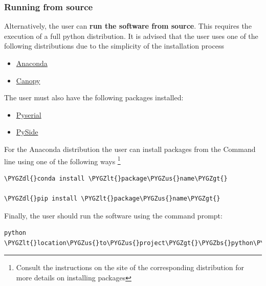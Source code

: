 \documentclass[letterpaper,10pt,english]{sphinxmanual}
\def\PYGZbs{\char`\\}
\def\PYGZus{\char`\_}
\def\PYGZlt{\char`\<}
\def\PYGZgt{\char`\>}
\def\PYGZdl{\char`\$}
\begin{document}
\subsubsection{Running from source}
\label{installation:running-from-source}
Alternatively, the user can \textbf{run the software from source}. This requires the execution
of a full python distribution. It is advised that the user uses one of the following distributions
due to the simplicity of the installation process
\begin{itemize}
\item {} 
\href{http://continuum.io/downloads}{Anaconda}

\item {} 
\href{https://store.enthought.com/downloads/}{Canopy}

\end{itemize}

The user must also have the following packages installed:
\begin{itemize}
\item {} 
\href{http://pyserial.sourceforge.net/}{Pyserial}

\item {} 
\href{http://qt-project.org/wiki/pyside}{PySide}

\end{itemize}

For the Anaconda distribution the user can install packages from the Command line
using one of the following ways \footnote{
Consult the instructions on the site of the corresponding distribution for more details on
installing packages
}

\begin{Verbatim}[commandchars=\\\{\}]
\PYGZdl{}conda install \PYGZlt{}package\PYGZus{}name\PYGZgt{}

\PYGZdl{}pip install \PYGZlt{}package\PYGZus{}name\PYGZgt{}
\end{Verbatim}

Finally, the user should run the software using the command prompt:

\begin{Verbatim}[commandchars=\\\{\}]
python \PYGZlt{}location\PYGZus{}to\PYGZus{}project\PYGZgt{}\PYGZbs{}python\PYGZus{}code\PYGZbs{}Pump3000.py
\end{Verbatim}
\end{document}
